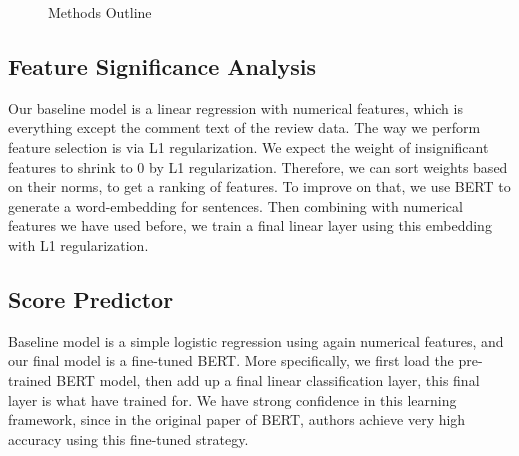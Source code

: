 \documentclass{article}
\begin{document}
\begin{figure}
	\centering
	
	\caption{Methods Outline}
\end{figure}

\subsection{Feature Significance Analysis}
Our baseline model is a linear regression with numerical features, which is everything except the comment text of the review data. The way we perform feature selection is via L1 regularization. We expect the weight of insignificant features to shrink to 0 by L1 regularization. Therefore, we can sort weights based on their norms, to get a ranking of features. To improve on that, we use BERT to generate a word-embedding for sentences. Then combining with numerical features we have used before, we train a final linear layer using this embedding with L1 regularization.

\subsection{Score Predictor}
Baseline model is a simple logistic regression using again numerical features, and our final model is a fine-tuned BERT. More specifically, we first load the pre-trained BERT model, then add up a final linear classification layer, this final layer is what have trained for. We have strong confidence in this learning framework, since in the original paper of BERT, authors achieve very high accuracy using this fine-tuned strategy.
\end{document}
